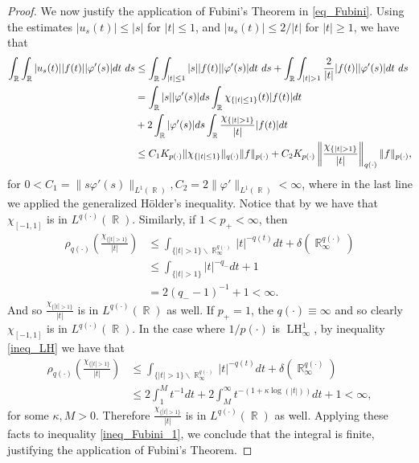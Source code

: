 \documentclass[11pt,reqno]{amsart}
\theoremstyle{definition}
\theoremstyle{definition}
\theoremstyle{definition}
\DeclareMathOperator{\R}{\mathbb{R}}
\newcommand{\p}{p(\cdot)}
\newcommand{\q}{q(\cdot)}
\newcommand{\LH}{\operatorname{LH}_\infty^1}
\begin{document}
\begin{proof}
We now justify the application of Fubini's Theorem in \eqref{eq_Fubini}. Using the estimates $\left|u_s(t)\right| \leq|s|$ for $|t| \leq 1$, and $\left|u_s(t)\right| \leq 2 /|t|$ for $|t| \geq 1$, we have that
\begin{align}
\int_{\R}\int_{\R}|u_s(t)||f(t)||\varphi'(s)|dt\ ds&\leq \int_{\R}\int_{|t|\leq 1}|s||f(t)||\varphi'(s)|dt\ ds+\int_{\R}\int_{|t|>1}\frac{2}{|t|}|f(t)||\varphi'(s)|dt\ ds\notag\\
&= \int_{\R}|s||\varphi'(s)|ds\int_{\R}\chi_{\{|t|\leq 1\}}(t)|f(t)|dt\notag\\
&+2\int_{\R}|\varphi'(s)|ds\int_{\R}\frac{\chi_{\{|t|>1\}}}{|t|}|f(t)|dt\notag\\
&\leq C_1K_{p(\cdot)}\|\chi_{\{|t|\leq 1\}}\|_{q(\cdot)}\|f\|_{p(\cdot)}+C_2K_{p(\cdot)}\left\|\frac{\chi_{\{|t|>1\}}}{|t|}\right\|_{q(\cdot)}\|f\|_{p(\cdot)},\label{ineq_Fubini_1}
\end{align}
for $0<C_1=\|s\varphi'(s)\|_{L^1(\R)},C_2=2\|\varphi'\|_{L^1(\R)}<\infty$, where in the last line we applied the generalized Hölder's inequality.
Notice that by \cite[Lemma 2.39]{Cruz-Uribe} we have that $\chi_{[-1,1]}$ is in $L^{\q}(\R)$. Similarly, if $1<p_{+}<\infty$, then 
\begin{align*}
    \rho_{q(\cdot)}\left(\frac{\chi_{\{|t|> 1\}}}{|t|}\right)&\leq\int_{\{|t|>1\}\backslash\R^{\q}_{\infty}}|t|^{-q(t)}dt+\delta\left(\R_\infty^{\q}\right)\\
    &\leq \int_{\{|t|>1\}}|t|^{-q_{-}}dt+1\\
    &=2(q_{-}-1)^{-1}+1<\infty.
\end{align*}
And so $\frac{\chi_{\{|t|> 1\}}}{|t|}$ is in $L^{\q}(\R)$ as well. If $p_+=1$, the $\q\equiv\infty$ and so clearly $\chi_{[-1,1]}$ is in $L^{\q}(\R)$.
In the case where $1/\p$ is $\LH$, by inequality \eqref{ineq_LH} we have that
\begin{align*}
     \rho_{q(\cdot)}\left(\frac{\chi_{\{|t|> 1\}}}{|t|}\right)&\leq\int_{\{|t|>1\}\backslash\R^{\q}_{\infty}}|t|^{-q(t)}dt+\delta\left(\R_\infty^{\q}\right)\\
    &\leq 2\int_{1}^Mt^{-1}dt + 2\int_M^\infty t^{-(1+\kappa\log(|t|))}dt+1
    <\infty,
\end{align*}
for some $\kappa,M>0$. Therefore $\frac{\chi_{\{|t|> 1\}}}{|t|}$ is in $L^{\q}(\R)$ as well. Applying these facts to inequality \eqref{ineq_Fubini_1}, we conclude that the integral is finite, justifying the application of Fubini's Theorem.





\end{proof}
\end{document}
